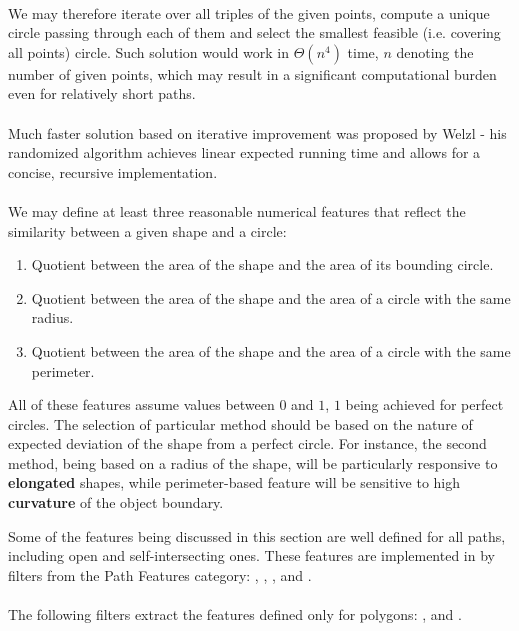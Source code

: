 \paragraph*{}
We may therefore iterate over all triples of the given points, compute a unique circle passing through each of them and select the smallest feasible (i.e. covering all points) circle. Such solution would work in $\Theta(n^4)$ time, $n$ denoting the number of given points, which may result in a significant computational burden even for relatively short paths.

\paragraph*{}
Much faster solution based on iterative improvement was proposed\cite{Welzl91} by Welzl - his randomized algorithm achieves linear expected running time and allows for a concise, recursive implementation.

\paragraph*{}
We may define at least three reasonable numerical features that reflect the similarity between a given shape and a circle:
\begin{enumerate}
	\item Quotient between the area of the shape and the area of its bounding circle.
	\item Quotient between the area of the shape and the area of a circle with the same radius.
	\item Quotient between the area of the shape and the area of a circle with the same perimeter.
\end{enumerate}
All of these features assume values between $0$ and $1$, $1$ being achieved for perfect circles. The selection of particular method should be based on the nature of expected deviation of the shape from a perfect circle. For instance, the second method, being based on a radius of the shape, will be particularly responsive to \textbf{elongated} shapes, while perimeter-based feature will be sensitive to high \textbf{curvature} of the object boundary.

\begin{refImpl}
Some of the features being discussed in this section are well defined for all paths, including open and self-intersecting ones. These features are implemented in \studio by filters from the Path Features category:
, 
, 
,
 and
.

\paragraph*{}
The following \studio filters extract the features defined only for polygons: 
, 
 and 
.
\end{refImpl}